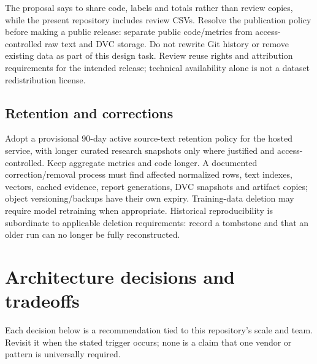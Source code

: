 \documentclass[10pt,letterpaper]{article}
\newcommand{\nextsection}[1]{\clearpage\section{#1}}
\begin{document}
The proposal says to share code, labels and totals rather than review copies, while the present repository includes review CSVs. Resolve the publication policy before making a public release: separate public code/metrics from access-controlled raw text and DVC storage. Do not rewrite Git history or remove existing data as part of this design task. Review reuse rights and attribution requirements for the intended release; technical availability alone is not a dataset redistribution license.

\subsection{Retention and corrections}
Adopt a provisional 90-day active source-text retention policy for the hosted service, with longer curated research snapshots only where justified and access-controlled. Keep aggregate metrics and code longer. A documented correction/removal process must find affected normalized rows, text indexes, vectors, cached evidence, report generations, DVC snapshots and artifact copies; object versioning/backups have their own expiry. Training-data deletion may require model retraining when appropriate. Historical reproducibility is subordinate to applicable deletion requirements: record a tombstone and that an older run can no longer be fully reconstructed.

\nextsection{Architecture decisions and tradeoffs}
Each decision below is a recommendation tied to this repository's scale and team. Revisit it when the stated trigger occurs; none is a claim that one vendor or pattern is universally required.
\end{document}
